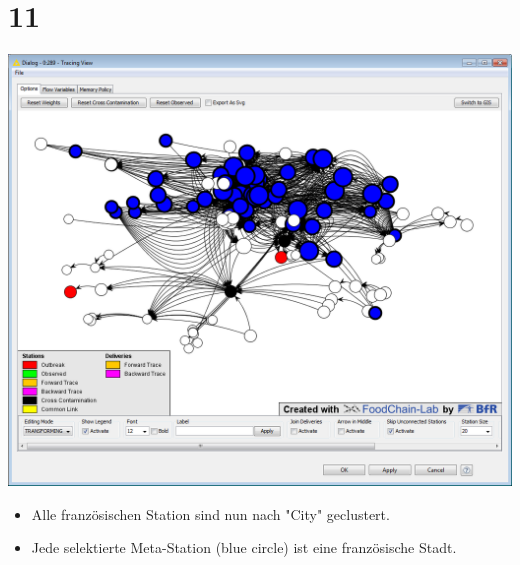 \documentclass{beamer}
\begin{document}
\section{11}
\begin{frame}
	\begin{center}
  		\includegraphics[height=0.6\textheight]{11.png}
	\end{center}
	\begin{itemize}
		\item Alle französischen Station sind nun nach "City" geclustert.
		\item Jede selektierte Meta-Station (blue circle) ist eine französische Stadt.
	\end{itemize}
\end{frame}
\end{document}
